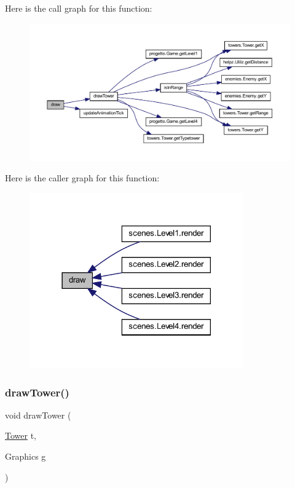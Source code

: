 Here is the call graph for this function\+:
\nopagebreak
\begin{figure}[H]
\begin{center}
\leavevmode
\includegraphics[width=350pt]{classmanagers_1_1_tower_manager_a72fe1ffca978e99fd16994a10e7f8051_cgraph}
\end{center}
\end{figure}
Here is the caller graph for this function\+:\nopagebreak
\begin{figure}[H]
\begin{center}
\leavevmode
\includegraphics[width=261pt]{classmanagers_1_1_tower_manager_a72fe1ffca978e99fd16994a10e7f8051_icgraph}
\end{center}
\end{figure}
\mbox{\label{classmanagers_1_1_tower_manager_a2cbe196e347dcc9a69a4d3dfdbec72de}} 
\subsubsection{\texorpdfstring{draw\+Tower()}{drawTower()}}
{\footnotesize\ttfamily void draw\+Tower (\begin{DoxyParamCaption}\item[{\hyperlink{classtowers_1_1_tower}{Tower}}]{t,  }\item[{Graphics}]{g }\end{DoxyParamCaption})\hspace{0.3cm}{\ttfamily [private]}}



